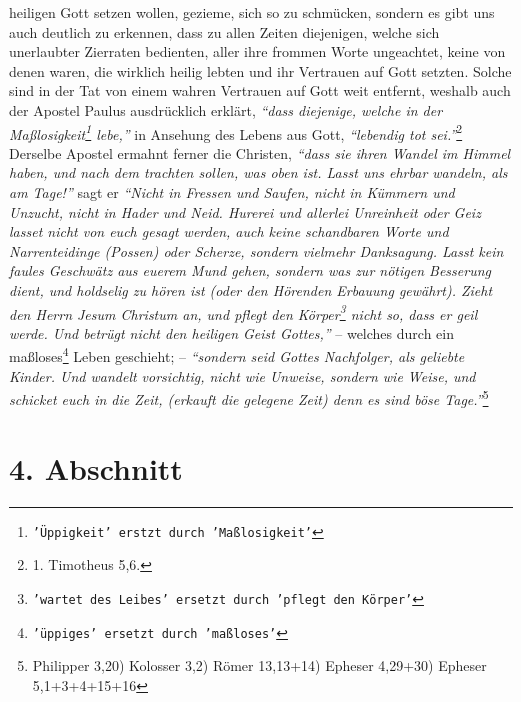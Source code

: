 heiligen Gott setzen wollen, gezieme, sich so zu schmücken, sondern es gibt uns
auch deutlich zu erkennen, dass zu allen Zeiten diejenigen, welche sich
unerlaubter Zierraten bedienten, aller ihre frommen Worte ungeachtet, keine von
denen waren, die wirklich heilig lebten und ihr Vertrauen auf Gott setzten.
Solche sind in der Tat von einem wahren Vertrauen auf Gott weit entfernt,
weshalb auch der Apostel Paulus ausdrücklich erklärt,
\textit{"`dass diejenige, welche
in der Maßlosigkeit\footnote{\texttt{'Üppigkeit' erstzt durch 'Maßlosigkeit'}}
lebe,"'} in 
Ansehung des Lebens aus Gott,
\textit{"`lebendig tot sei."'}\footnote{1. Timotheus 5,6.}
Derselbe Apostel ermahnt ferner die Christen,
\textit{"`dass sie ihren Wandel im Himmel haben, und nach dem trachten sollen,
was oben
ist. Lasst uns ehrbar wandeln, als am Tage!"'} sagt er
\textit{"`Nicht in Fressen und
Saufen, nicht in Kümmern und Unzucht, nicht in Hader und Neid. Hurerei und
allerlei Unreinheit oder Geiz lasset nicht von euch gesagt werden, auch keine
schandbaren Worte und Narrenteidinge (Possen) oder Scherze, sondern vielmehr
Danksagung. Lasst kein faules Geschwätz aus euerem Mund gehen, sondern was zur
nötigen Besserung dient, und holdselig zu hören ist (oder den Hörenden
Erbauung gewährt). Zieht den Herrn Jesum Christum an, und pflegt den
Körper\footnote{\texttt{'wartet des Leibes' 
ersetzt durch 'pflegt den Körper'}} 
nicht so, dass er geil werde. Und betrügt nicht den heiligen Geist Gottes,"'} --
welches durch ein maßloses\footnote{\texttt{'üppiges' ersetzt durch 'maßloses'}}
Leben geschieht; --
\textit{"`sondern seid Gottes Nachfolger,
als geliebte Kinder. Und wandelt vorsichtig, nicht wie Unweise, sondern wie
Weise, und schicket euch in die Zeit, (erkauft die gelegene Zeit) denn es sind
böse Tage."'}\footnote{Philipper 3,20)  Kolosser 3,2)  Römer 13,13+14) Epheser
4,29+30) Epheser 5,1+3+4+15+16}

\section{4. Abschnitt} \label{kap15_ab4}

